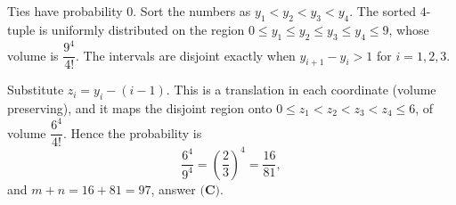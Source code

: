 Ties have probability $0$. Sort the numbers as $y_1<y_2<y_3<y_4$. The sorted $4$-tuple is uniformly distributed on the region $0\le y_1\le y_2\le y_3\le y_4\le9$, whose volume is $\dfrac{9^4}{4!}$. The intervals are disjoint exactly when $y_{i+1}-y_i>1$ for $i=1,2,3$.

Substitute $z_i=y_i-(i-1)$. This is a translation in each coordinate (volume preserving), and it maps the disjoint region onto $0\le z_1<z_2<z_3<z_4\le6$, of volume $\dfrac{6^4}{4!}$. Hence the probability is
\[
\dfrac{6^4}{9^4}=\left(\dfrac{2}{3}\right)^4=\dfrac{16}{81},
\]
and $m+n=16+81=\boxed{97}$, answer $\textbf{(C)}$.
